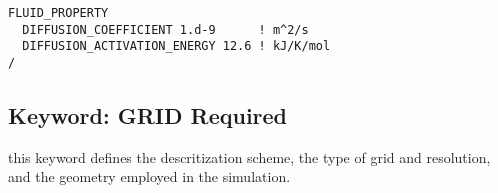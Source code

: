 \begin{mdframed}

\begin{verbatim}
FLUID_PROPERTY
  DIFFUSION_COEFFICIENT 1.d-9      ! m^2/s
  DIFFUSION_ACTIVATION_ENERGY 12.6 ! kJ/K/mol
/
\end{verbatim}
\end{mdframed}

\hyperlink{target_key}{\return}


\newpage
\protect\hypertarget{target_grid}{}

\subsection{Keyword: GRID \hfill Required}

 this keyword defines the descritization scheme, the type of grid and resolution, and the geometry employed in the simulation.

